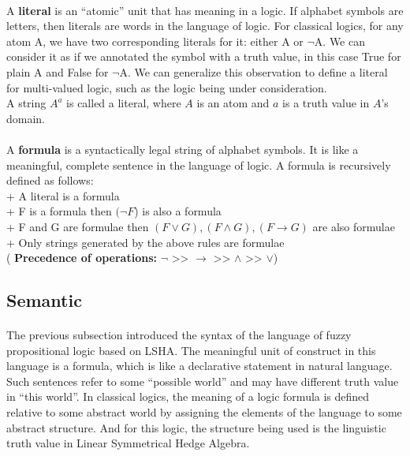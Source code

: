 \documentclass[part1.tex]{subfiles}
\begin{document}
\paragraph{} A {\bfseries literal} is an ``atomic'' unit that
has meaning in a logic. If alphabet symbols are letters, then literals
are words in the language of logic. For classical logics, for any
atom A, we have two corresponding literals for
it: either A or $\neg{\text{A}}$. We can consider it as if we
annotated the symbol with a truth value, in this case True for
plain A and False for $\neg{\text{A}}$. We can generalize this
observation to define a literal for multi-valued logic, such as
the logic being under consideration.\\
A string \(A^a\) is called a literal, where
\(A\) is an atom and \(a\) is a truth value in \(A\)'s domain.

\paragraph{} A {\bfseries formula} is a syntactically legal string of alphabet
symbols. It is like a meaningful, complete sentence in the language of
logic. A formula is recursively defined as follows:\\
 \indent + A literal is a formula\\
 \indent + F is a formula then \( (\neg F\)) is also a formula\\
 \indent + F and G are formulae then \( (F\vee G), (F\wedge G), (F \to G)\) are also formulae\\
 \indent + Only strings generated by the above rules are formulae\\
 \indent ( {\bfseries Precedence of operations:} \(\neg\)  >>  \(\to\)  >>  \(\wedge\)  >>  \(\vee\))\\

\subsection{Semantic}
\paragraph{} The previous subsection introduced the syntax of the
language of fuzzy propositional logic based on LSHA. The meaningful
unit of construct in this language is a formula, which is like a
declarative statement in natural language. Such sentences refer
to some ``possible world'' and may have different truth value in
``this world''. In classical logics, the meaning of a logic 
formula is defined relative to some abstract world by assigning
the elements of the language to some abstract structure. And for
this logic, the structure being used is the linguistic truth value 
in Linear Symmetrical Hedge Algebra.
\end{document}
